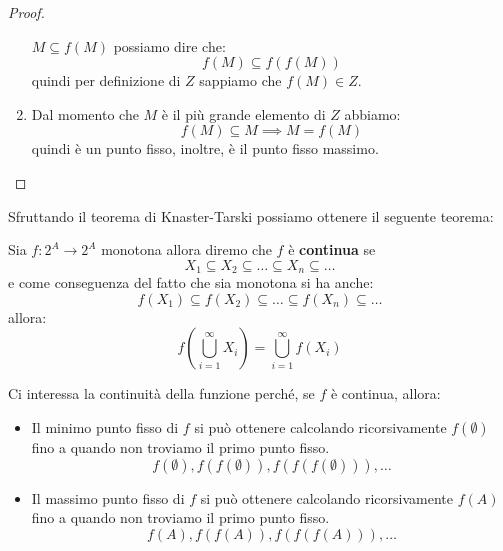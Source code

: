 \begin{teorema}
\begin{proof}
\begin{enumerate}
                  $M \subseteq f(M)$ possiamo dire che:
                  \begin{equation}
                      f(M) \subseteq f(f(M))
                  \end{equation}
                  quindi per definizione di $Z$ sappiamo che $f(M)\in Z$.
            \item Dal momento che $M$ è il più grande elemento di $Z$ abbiamo:
                  \begin{equation}
                      f(M) \subseteq M \implies M = f(M)
                  \end{equation}
                  quindi è un punto fisso, inoltre, è il punto fisso massimo.
        \end{enumerate}
    \end{proof}
\end{teorema}
Sfruttando il teorema di Knaster-Tarski possiamo ottenere il seguente teorema:
\begin{teorema}
    Sia $f:2^A \to 2^A$ monotona allora diremo che $f$ è \textbf{continua} se
    \begin{equation}
        X_1 \subseteq X_2 \subseteq \dots \subseteq X_n \subseteq \dots
    \end{equation}
    e come conseguenza del fatto che sia monotona si ha anche:
    \begin{equation}
        f(X_1) \subseteq f(X_2) \subseteq \dots \subseteq f(X_n) \subseteq \dots
    \end{equation}
    allora:
    \begin{equation}
        f(\bigcup_{i=1}^{\infty} X_i) = \bigcup_{i=1}^{\infty} f(X_i)
    \end{equation}
\end{teorema}
Ci interessa la continuità della funzione perché, se $f$ è continua, allora:
\begin{itemize}
    \item Il minimo punto fisso di $f$ si può ottenere calcolando ricorsivamente
          $f(\emptyset)$ fino a quando non troviamo il primo punto fisso.
          \begin{equation}
              f(\emptyset), f(f(\emptyset)), f(f(f(\emptyset))), \dots
          \end{equation}
    \item Il massimo punto fisso di $f$ si può ottenere calcolando ricorsivamente
          $f(A)$ fino a quando non troviamo il primo punto fisso.
          \begin{equation}
              f(A), f(f(A)), f(f(f(A))), \dots
          \end{equation}
\end{itemize}
